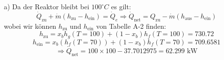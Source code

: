 a) Da der Reaktor bleibt bei \(100^\circ C\) es gilt:
\[
\dot{Q}_{\text{zu}} + \dot{m} (h_{\text{zu}} - h_{\text{ein}}) = \dot{Q}_e \Rightarrow \dot{Q}_{\text{net}} = Q_{\text{zu}} - \dot{m} (h_{\text{aus}} - h_{\text{ein}})
\]
wobei wir können \(h_{\text{zu}}\) und \(h_{\text{ein}}\) von Tabelle A-2 finden:
\[
h_{\text{zu}} = x_b h_g (T = 100) + (1 - x_b) h_f (T = 100) = 730.72
\]
\[
h_{\text{ein}} = x_b (h_f (T = 70)) + (1 - x_b) h_f (T = 70) = 709.6581
\]
\[
\Rightarrow \dot{Q}_{\text{net}} = 100 \times 100 - 37.7012975 = \boxed{62.299 \text{ kW}}
\]